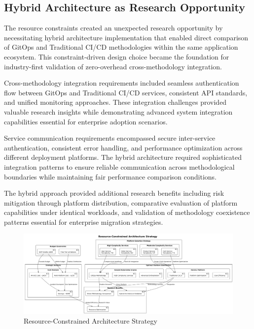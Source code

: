 
\subsection{Hybrid Architecture as Research Opportunity}

The resource constraints created an unexpected research opportunity by necessitating hybrid architecture implementation that enabled direct comparison of GitOps and Traditional CI/CD methodologies within the same application ecosystem. This constraint-driven design choice became the foundation for industry-first validation of zero-overhead cross-methodology integration.

Cross-methodology integration requirements included seamless authentication flow between GitOps and Traditional CI/CD services, consistent API standards, and unified monitoring approaches. These integration challenges provided valuable research insights while demonstrating advanced system integration capabilities essential for enterprise adoption scenarios.

Service communication requirements encompassed secure inter-service authentication, consistent error handling, and performance optimization across different deployment platforms. The hybrid architecture required sophisticated integration patterns to ensure reliable communication across methodological boundaries while maintaining fair performance comparison conditions.


The hybrid approach provided additional research benefits including risk mitigation through platform distribution, comparative evaluation of platform capabilities under identical workloads, and validation of methodology coexistence patterns essential for enterprise migration strategies.

\begin{figure}[H]
\centering
\includegraphics[width=1.0\textwidth]{figures/Resource-Constrained-Architecture-Strategy.png}
\caption{Resource-Constrained Architecture Strategy}
\label{fig:resource-constrained-architecture}
\end{figure}

